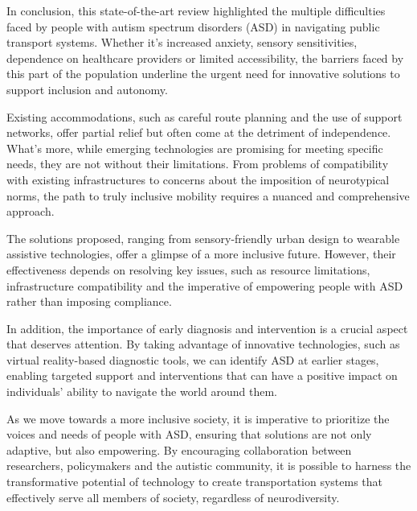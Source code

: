 
In conclusion, this state-of-the-art review highlighted the multiple difficulties faced by people with autism spectrum disorders (ASD) in navigating public transport systems. Whether it's increased anxiety, sensory sensitivities, dependence on healthcare providers or limited accessibility, the barriers faced by this part of the population underline the urgent need for innovative solutions to support inclusion and autonomy.

Existing accommodations, such as careful route planning and the use of support networks, offer partial relief but often come at the detriment of independence. What's more, while emerging technologies are promising for meeting specific needs, they are not without their limitations. From problems of compatibility with existing infrastructures to concerns about the imposition of neurotypical norms, the path to truly inclusive mobility requires a nuanced and comprehensive approach.

The solutions proposed, ranging from sensory-friendly urban design to wearable assistive technologies, offer a glimpse of a more inclusive future. However, their effectiveness depends on resolving key issues, such as resource limitations, infrastructure compatibility and the imperative of empowering people with ASD rather than imposing compliance.

In addition, the importance of early diagnosis and intervention is a crucial aspect that deserves attention. By taking advantage of innovative technologies, such as virtual reality-based diagnostic tools, we can identify ASD at earlier stages, enabling targeted support and interventions that can have a positive impact on individuals' ability to navigate the world around them.

As we move towards a more inclusive society, it is imperative to prioritize the voices and needs of people with ASD, ensuring that solutions are not only adaptive, but also empowering. By encouraging collaboration between researchers, policymakers and the autistic community, it is possible to harness the transformative potential of technology to create transportation systems that effectively serve all members of society, regardless of neurodiversity.
\medskip



